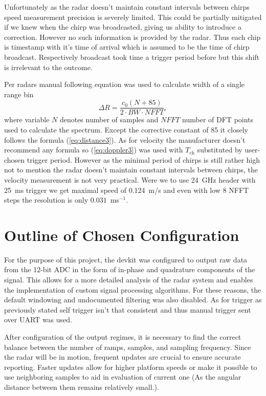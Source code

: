 Unfortunately as the radar doesn't maintain constant intervals between chirps speed measurement precision is severely limited.
This could be partially mitigated if we knew when the chirp was broadcasted, giving us ability to introduce a correction.
However no such information is provided by the radar.
Thus each chip is timestamp with it's time of arrival which is assumed to be the time of chirp broadcast.
Respectively broadcast took time a trigger period before but this shift is irrelevant to the outcome.

Per radars manual \cite{sidarPRO} following equation was used to calculate width of a single range bin
\begin{equation}
  \Delta R = \frac{c_0 (N+85)}{2\cdot BW\cdot NFFT},
  \label{eq:rangeBin}
\end{equation}
where variable $N$ denotes number of samples and $NFFT$ number of DFT points used to calculate the spectrum.
Except the corrective constant of 85 it closely follows the formula (\ref{eq:distance3}).
As for velocity the manufacturer doesn't recommend any formula so (\ref{eq:doppler3}) was used with $T_\mathrm{ch}$ substituted by user-chosen trigger period.
However as the minimal period of chirps is still rather high not to mention the radar doesn't maintain constant intervals between chirps, the velocity measurement is not very practical.
Were we to use 24~GHz header with 25~ms trigger we get maximal speed of 0.124~m/s and even with low 8 NFFT steps the resolution is only $0.031$~ms$^{-1}$.

\section{Outline of Chosen Configuration }


For the purpose of this project, the devkit was configured to output raw data from the 12-bit ADC in the form of in-phase and quadrature components of the signal.
This allows for a more detailed analysis of the radar system and enables the implementation of custom signal processing algorithms.
For these reasons, the default windowing and undocumented filtering was also disabled.
As for trigger as previously stated self trigger isn't that consistent and thus manual trigger sent over UART was used.

After configuration of the output regimes, it is necessary to find the correct balance between the number of ramps, samples, and sampling frequency.
Since the radar will be in motion, frequent updates are crucial to ensure accurate reporting.
Faster updates allow for higher platform speeds or make it possible to use neighboring samples to aid in evaluation of current one (As the angular distance between them remains relatively small.).

